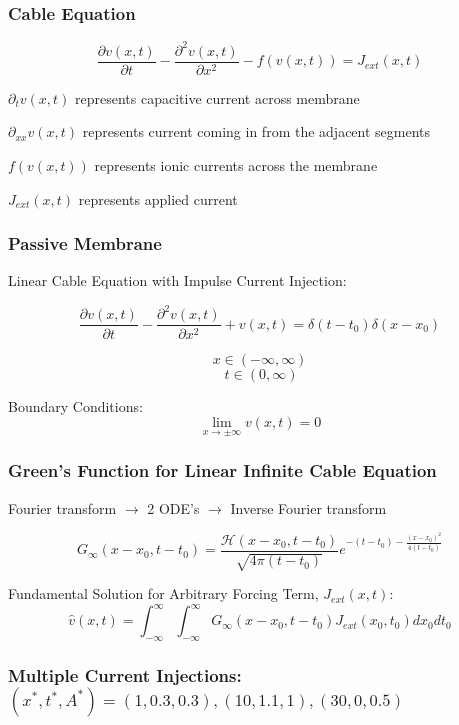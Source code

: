 \documentclass{beamer}
\begin{document}
\begin{frame}
\frametitle{Cable Equation}
\[\frac{\partial{v(x,t)}}{\partial{t}} - \frac{\partial^2{v(x,t)}}{\partial{x}^2} - f(v(x,t))= J_{ext}(x,t)\] \newline

$ \partial_t{v(x,t)} $ represents capacitive current across membrane \newline 

$ \partial_{xx}{v(x,t)} $ represents current coming in from the adjacent segments \newline 

$  f(v(x,t))$ represents ionic currents across the membrane \newline 

$ J_{ext}(x,t)$ represents applied current
\end{frame}


\begin{frame}
\frametitle{Passive Membrane}
Linear Cable Equation with Impulse Current Injection:

$$\frac{\partial{v(x,t)}}{\partial{t}} - \frac{\partial^2{v(x,t)}}{\partial{x}^2} + v(x,t)=\delta(t-t_0)\delta(x-x_0)$$ 

$$x \in (-\infty, \infty)$$
$$\ t \in (0,\infty)$$ \newline

Boundary Conditions:
$$\lim_{x\to \pm \infty} v(x,t) = 0$$
\end{frame}

\begin{frame}
\frametitle{Green's Function for Linear Infinite Cable Equation}
Fourier transform $\rightarrow$ 2 ODE's $\rightarrow$ Inverse Fourier transform

$$  G_{\infty}(x-x_0,t-t_0) = \frac{\mathcal{H}(x-x_0,t-t_0)}{\sqrt{4\pi (t-t_0)}}e^{-(t-t_0)-\frac{(x-x_0)^2}{4(t-t_0)}}$$\newline

Fundamental Solution for Arbitrary Forcing Term, $J_{ext}(x,t)$:
$$ \hat{v}(x,t) = \int_{-\infty}^{\infty}\int_{-\infty}^{\infty}G_{\infty}(x-x_0,t-t_0)J_{ext}(x_0,t_0)dx_0dt_0 $$
\end{frame}

\begin{frame}
\frametitle{Multiple Current Injections: $(x^*,t^*,A^*) = (1, 0.3, 0.3), (10,1.1,1), (30,0,0.5)$}
	
\end{frame}
\end{document}
